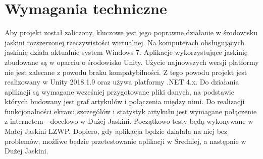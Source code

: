 \section{Wymagania techniczne}
Aby projekt został zaliczony, kluczowe jest jego poprawne działanie w środowisku jaskini rozszerzonej rzeczywistości wirtualnej. Na komputerach obsługujących jaskinię działa aktualnie system Windows 7. Aplikacje wykorzystujące jaskinię zbudowane są w oparciu o środowisko Unity. Użycie najnowszych wersji platformy nie jest zalecane z powodu braku kompatybilności. Z tego powodu projekt jest realizowany w Unity 2018.1.9 oraz używa platformy .NET 4.x. 
Do działania aplikacji są wymagane wcześniej przygotowane pliki danych, na podstawie których budowany jest graf artykułów i połączenia między nimi. Do realizacji funkcjonalności ekranu szczegółów i statystyk artykułu jest wymagane połączenie z internetem - docelowo w Dużej Jaskini. Początkowo testy będą wykonywane w Małej Jaskini LZWP. Dopiero, gdy aplikacja będzie działała na niej bez problemów, możliwe będzie przetestowanie aplikacji w Średniej, a następnie w Dużej Jaskini.
